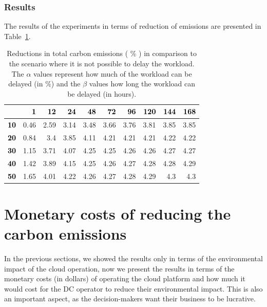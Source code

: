 \subsubsection{Results}

The results of the experiments in terms of reduction of  emissions are presented in Table~\ref{tab:flex_scheduling}.


\begin{table}[h]
\caption{Reductions in total carbon emissions ( \% ) in comparison to the scenario where it is not possible to delay the workload. The $\alpha$ values represent how much of the workload can be delayed (in \%) and the $\beta$ values how long the workload can be delayed (in hours). }\centering
\label{tab:flex_scheduling}
\begin{tabular}{|l|r|r|r|r|r|r|r|r|r|}
\hline
\backslashbox{$\alpha$}{$\beta$} &   \textcolor{black}{\textbf{ 1}} &  \textcolor{black}{\textbf{ 12 }} &  \textcolor{black}{\textbf{ 24 }} &  \textcolor{black}{\textbf{ 48 }}  &   \textcolor{black}{\textbf{ 72 }} &   \textcolor{black}{\textbf{ 96 }} &   \textcolor{black}{\textbf{ 120  }} &   \textcolor{black}{\textbf{ 144 }} &   \textcolor{black}{\textbf{ 168 }} \\ 
     \hline
 \textcolor{black}{ \textbf{10}}   &  0.46 &  2.59 &  3.14 &  3.48 &  3.66 &  3.76 &  3.81 &  3.85 &  3.85 \\ 
\hline
 \textcolor{black}{ \textbf{20}}   &  0.84 &  3.4 &  3.85 &  4.11 &  4.21 &  4.21 &  4.21 &  4.22 &  4.22 \\ 
\hline
 \textcolor{black}{ \textbf{30}}   &  1.15 &  3.71 &  4.07 &  4.25 &  4.25 &  4.26 &  4.26 &  4.27 &  4.27 \\ 
\hline
 \textcolor{black}{ \textbf{40}}   &  1.42 &  3.89 &  4.15 &  4.25 &  4.26 &  4.27 &  4.28 &  4.28 &  4.29 \\ 
\hline
 \textcolor{black}{ \textbf{50}}   &  1.65 &  4.01 &  4.22 &  4.26 &  4.27 &  4.28 &  4.29 &  4.3 &  4.3 \\ 
\hline
\end{tabular}
\end{table}


\section{ Monetary costs of reducing the carbon emissions}
\label{sec:costs}

In the previous sections, we showed the results only in terms of the environmental impact of the cloud operation, now we present the results in terms of the monetary costs (in dollars) of operating the cloud platform and how much it would cost for the DC operator to reduce their environmental impact. This is also an important aspect, as the decision-makers want their business to be lucrative.

